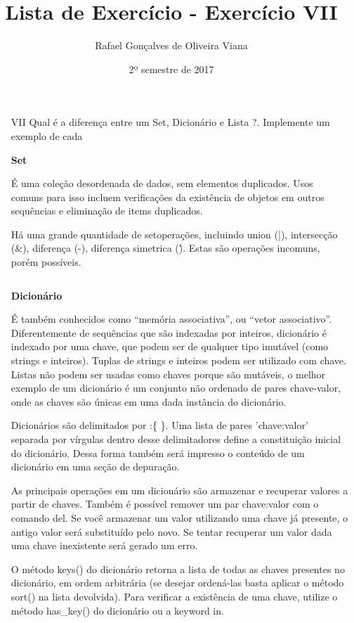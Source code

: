 \documentclass[12pt]{article}
\title{Lista de Exercício  - Exercício VII }
\author{Rafael Gonçalves de  Oliveira Viana}
\date{2º semestre de 2017}
\begin{document}
\maketitle

\begin{enumerate}
\item[VII] Qual é a diferença entre um Set, Dicionário e Lista ?. Implemente um exemplo de cada

\textbf{Set}

É uma coleção desordenada de dados, sem elementos duplicados. Usos comuns para isso incluem verificações da existência de objetos em outros sequências e eliminação de items duplicados.

Há uma grande quantidade de setoperações, incluindo union (|), intersecção (\&), diferença (-),  diferença simetrica (\^). Estas são operações incomuns, porém possíveis.
\inputminted{python}{Exemplo-7/Set.py}

\textbf{Dicionário}

É também conhecidos como ``memória associativa'', ou ``vetor associativo''. Diferentemente de sequências que são indexadas por inteiros, dicionário é indexado por uma chave, que podem ser de qualquer tipo imutável (como strings e inteiros). Tuplas de strings e inteiros podem ser utilizado com chave. Listas não podem ser usadas como chaves porque são mutáveis, o melhor exemplo de um dicionário é um conjunto não ordenado de pares chave-valor, onde as chaves são únicas em uma dada instância do dicionário.

Dicionários são delimitados por :\{ \}. Uma lista de pares 'chave:valor' separada por vírgulas dentro desse delimitadores define a constituição inicial do dicionário. Dessa forma também será impresso o conteúdo de um dicionário em uma seção de depuração.

As principais operações em um dicionário são armazenar e recuperar valores a partir de chaves. Também é possível remover um par chave:valor com o comando del. Se você armazenar um valor utilizando uma chave já presente, o antigo valor será substituído pelo novo. Se tentar recuperar um valor dada uma chave inexistente será gerado um erro.

O método keys() do dicionário retorna a lista de todas as chaves presentes no dicionário, em ordem arbitrária (se desejar ordená-las basta aplicar o método sort() na lista devolvida). Para verificar a existência de uma chave, utilize o método has\_key() do dicionário ou a keyword in.
\inputminted{python}{Exemplo-7/Dicionario.py}


\end{enumerate}
\end{document}
